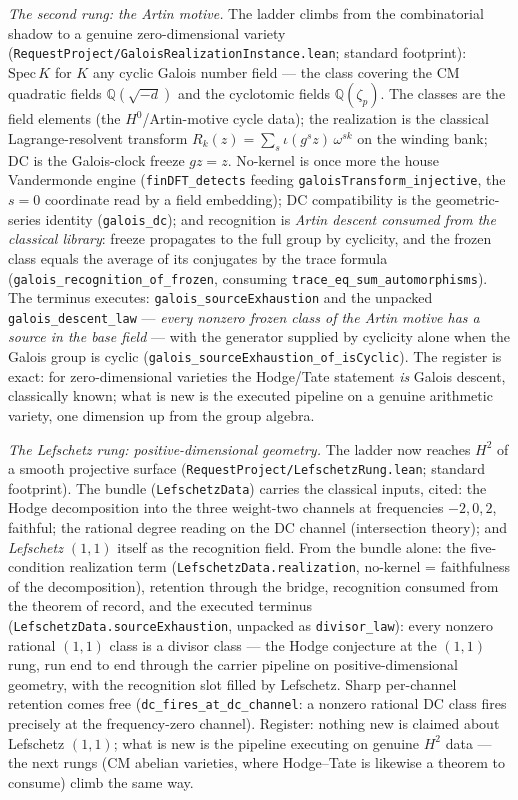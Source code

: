 \documentclass[11pt]{article}
\theoremstyle{definition}
\theoremstyle{remark}
\begin{document}
\emph{The second rung: the Artin motive.} The ladder climbs from the
combinatorial shadow to a genuine zero-dimensional variety
(\texttt{RequestProject/GaloisRealizationInstance.lean}; standard footprint):
$\mathrm{Spec}\,K$ for $K$ any cyclic Galois number field --- the class
covering the CM quadratic fields $\mathbb Q(\sqrt{-d})$ and the cyclotomic
fields $\mathbb Q(\zeta_p)$. The classes are the field elements (the
$H^0$/Artin-motive cycle data); the realization is the classical
Lagrange-resolvent transform $R_k(z)=\sum_s\iota(g^sz)\,\omega^{sk}$ on the
winding bank; DC is the Galois-clock freeze $gz=z$. No-kernel is once more
the house Vandermonde engine (\texttt{finDFT\_detects} feeding
\texttt{galoisTransform\_injective}, the $s=0$ coordinate read by a field
embedding); DC compatibility is the geometric-series identity
(\texttt{galois\_dc}); and recognition is \emph{Artin descent consumed from
the classical library}: freeze propagates to the full group by cyclicity, and
the frozen class equals the average of its conjugates by the trace formula
(\texttt{galois\_recognition\_of\_frozen}, consuming
\texttt{trace\_eq\_sum\_automorphisms}). The terminus executes:
\texttt{galois\_sourceExhaustion} and the unpacked
\texttt{galois\_descent\_law} --- \emph{every nonzero frozen class of the
Artin motive has a source in the base field} --- with the generator supplied
by cyclicity alone when the Galois group is cyclic
(\texttt{galois\_sourceExhaustion\_of\_isCyclic}). The register is exact: for
zero-dimensional varieties the Hodge/Tate statement \emph{is} Galois descent,
classically known; what is new is the executed pipeline on a genuine
arithmetic variety, one dimension up from the group algebra.

\emph{The Lefschetz rung: positive-dimensional geometry.} The ladder now
reaches $H^2$ of a smooth projective surface
(\texttt{RequestProject/LefschetzRung.lean}; standard footprint). The bundle
(\texttt{LefschetzData}) carries the classical inputs, cited: the Hodge
decomposition into the three weight-two channels at frequencies $-2,0,2$,
faithful; the rational degree reading on the DC channel (intersection
theory); and \emph{Lefschetz $(1,1)$} itself as the recognition field. From
the bundle alone: the five-condition realization term
(\texttt{LefschetzData.realization}, no-kernel = faithfulness of the
decomposition), retention through the bridge, recognition consumed from the
theorem of record, and the executed terminus
(\texttt{LefschetzData.sourceExhaustion}, unpacked as
\texttt{divisor\_law}): every nonzero rational $(1,1)$ class is a divisor
class --- the Hodge conjecture at the $(1,1)$ rung, run end to end through
the carrier pipeline on positive-dimensional geometry, with the recognition
slot filled by Lefschetz. Sharp per-channel retention comes free
(\texttt{dc\_fires\_at\_dc\_channel}: a nonzero rational DC class fires
precisely at the frequency-zero channel). Register: nothing new is claimed
about Lefschetz $(1,1)$; what is new is the pipeline executing on genuine
$H^2$ data --- the next rungs (CM abelian varieties, where Hodge--Tate is
likewise a theorem to consume) climb the same way.
\end{document}
